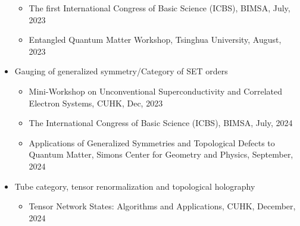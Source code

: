 \documentclass[hidelinks,a4paper]{article}
\begin{document}
\begin{itemize}
\begin{itemize}
     \item  The first International Congress of Basic Science (ICBS), BIMSA, July, 2023
     \item  Entangled Quantum Matter Workshop, Tsinghua University, August, 2023
  \end{itemize}
  \item Gauging of generalized symmetry/Category of SET orders~\supercite{LYW2312.15958}
  \begin{itemize}\small
    \item  Mini-Workshop on Unconventional Superconductivity and Correlated Electron Systems, CUHK, Dec, 2023
    \item  The International Congress of Basic Science (ICBS), BIMSA, July, 2024
    \item  Applications of Generalized Symmetries and Topological Defects to Quantum Matter, Simons Center for Geometry and Physics, September, 2024 
  \end{itemize}
  \item Tube category, tensor renormalization and topological holography
  \begin{itemize}\small
    \item Tensor Network States: Algorithms and Applications, CUHK, December, 2024
  \end{itemize}
  
\end{itemize}

\printbibliography[title=Publications]
\end{document}
